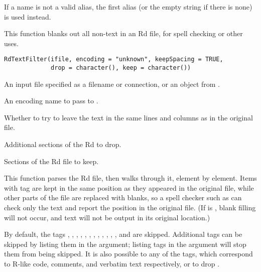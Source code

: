 %
\begin{Details}\relax
If a name is not a valid alias, the first alias (or the empty string
if there is none) is used instead.
\end{Details}
%
\begin{Description}\relax
This function blanks out all non-text in an Rd file, 
for spell checking or other uses.
\end{Description}
%
\begin{Usage}
\begin{verbatim}
RdTextFilter(ifile, encoding = "unknown", keepSpacing = TRUE,
             drop = character(), keep = character())
\end{verbatim}
\end{Usage}
%
\begin{Arguments}
\begin{ldescription}
\item[\code{ifile}] 
An input file specified as a filename or connection, or an  object
from .

\item[\code{encoding}] 
An encoding name to pass to .

\item[\code{keepSpacing}] 
Whether to try to leave the text in the same lines and columns
as in the original file.

\item[\code{drop}] 
Additional sections of the Rd to drop.

\item[\code{keep}] 
Sections of the Rd file to keep.

\end{ldescription}
\end{Arguments}
%
\begin{Details}\relax
This function parses the Rd file, then walks through it, element by
element.  Items with tag  are kept in the same position as
they appeared in the original file, while other parts of the file are
replaced with blanks, so a spell checker such as 
can check only the text and report the position in the original file.
(If  is , blank filling will not occur,
and text will not be output in its original location.)

By default, the tags , ,
, , , ,
, , , ,
, , and  are skipped.  Additional
tags can be skipped by listing them in the  argument;
listing tags in the  argument will stop them from being
skipped.  It is also possible to  any of the
 tags, which correspond to R-like
code, comments, and verbatim text respectively, or to drop
.
\end{Details}
